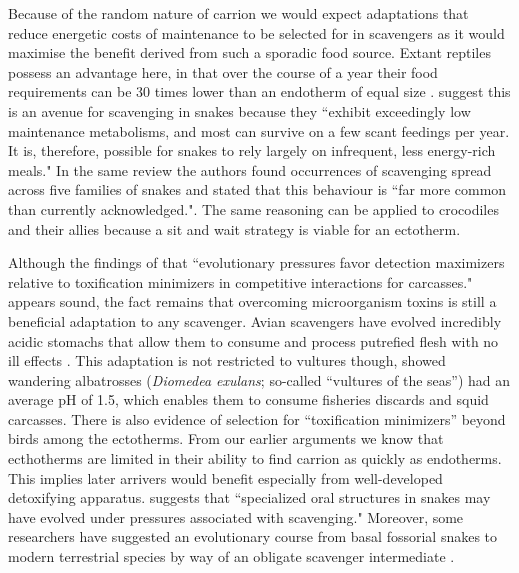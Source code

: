 \documentclass[a4paper,12pt]{article}
\begin{document}
Because of the random nature of carrion we would expect adaptations that reduce energetic costs of maintenance to be selected for in scavengers as it would maximise the benefit derived from such a sporadic food source. 
Extant reptiles possess an advantage here, in that over the course of a year their food requirements can be 30 times lower than an endotherm of equal size \citep{Nagy1621}.
\cite{devault2002scavenging} suggest this is an avenue for scavenging in snakes because they ``exhibit exceedingly low maintenance metabolisms, and most can survive on  a few scant feedings per year.
It is, therefore, possible for snakes to rely largely on infrequent, less energy-rich meals."
In the same review the authors found occurrences of scavenging spread across five families of snakes and stated that this behaviour is ``far more common than currently acknowledged."\citep{devault2002scavenging}.
The same reasoning can be applied to crocodiles and their allies \citep{forrest2003evidence} because a sit and wait strategy is viable for an ectotherm. 
%

Although the findings of \cite{shivik2006vultures} that ``evolutionary pressures favor detection maximizers relative to toxification minimizers in competitive interactions for carcasses." appears sound, the fact remains that overcoming microorganism toxins is still a beneficial adaptation to any scavenger. 
Avian scavengers have evolved incredibly acidic stomachs that allow them to consume and process putrefied flesh with no ill effects \citep{houston1975digestive,roggenbuck2014microbiome}. 
This adaptation is not restricted to vultures though, \cite{gremillet2012vultures} showed wandering albatrosses (\textit{Diomedea exulans}; so-called ``vultures of the seas'') had an average pH of 1.5, which enables them to consume fisheries discards and squid carcasses. 
There is also evidence of selection for ``toxification minimizers'' beyond birds among the ectotherms.
From our earlier arguments we know that ecthotherms are limited in their ability to find carrion as quickly as endotherms. 
This implies later arrivers would benefit especially from well-developed detoxifying apparatus. 
\cite{shivik2006vultures} suggests that ``specialized oral structures in snakes may have evolved under pressures associated with scavenging."
Moreover, some researchers have suggested an evolutionary course from basal fossorial snakes to modern terrestrial species by way of an obligate scavenger intermediate \citep{bauchot2006snakes}. 
\end{document}
